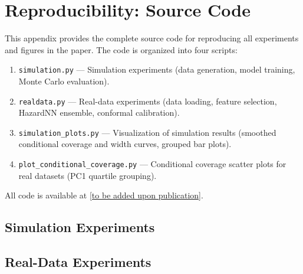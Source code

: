 \section{Reproducibility: Source Code}
\label{sec:appendix_code}

This appendix provides the complete source code for reproducing all experiments and figures in the paper. The code is organized into four scripts:

\begin{enumerate}
    \item \texttt{simulation.py} --- Simulation experiments (data generation, model training, Monte Carlo evaluation).
    \item \texttt{realdata.py} --- Real-data experiments (data loading, feature selection, HazardNN ensemble, conformal calibration).
    \item \texttt{simulation\_plots.py} --- Visualization of simulation results (smoothed conditional coverage and width curves, grouped bar plots).
    \item \texttt{plot\_conditional\_coverage.py} --- Conditional coverage scatter plots for real datasets (PC1 quartile grouping).
\end{enumerate}

All code is available at \url{[to be added upon publication]}.

\subsection{Simulation Experiments}
\label{sec:code_simulation}



\subsection{Real-Data Experiments}
\label{sec:code_realdata}



